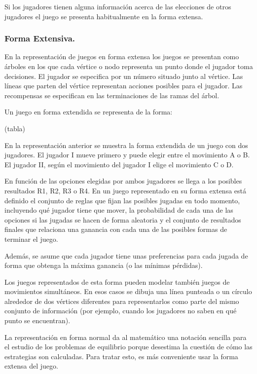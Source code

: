 \documentclass[a4paper]{report} %
\begin{document}
Si los jugadores tienen alguna información acerca de las elecciones de otros jugadores el juego se presenta habitualmente en la forma extensa. 

\subsubsection{Forma Extensiva.}

En la representación de juegos en forma extensa los juegos se presentan como árboles en los que cada vértice o nodo representa un punto donde el jugador toma decisiones. El jugador se especifica por un número situado junto al vértice. Las líneas que parten del vértice representan acciones posibles para el jugador. Las recompensas se especifican en las terminaciones de las ramas del árbol. 

Un juego en forma extendida se representa de la forma: 

(tabla)


En la representación anterior se muestra la forma extendida de un juego con dos jugadores. El jugador I mueve primero y puede elegir entre el movimiento A o B. El jugador II, según el movimiento del jugador I elige el movimiento C o D.

En función de las opciones elegidas por ambos jugadores se llega a los posibles resultados R1, R2, R3 o R4. En un juego representado en su forma extensa está definido el conjunto de reglas que fijan las posibles jugadas en todo momento, incluyendo qué jugador tiene que mover, la probabilidad de cada una de las opciones si las jugadas se hacen de forma aleatoria y el conjunto de resultados finales que relaciona una ganancia con cada una de las posibles formas de terminar el juego.

Además, se asume que cada jugador tiene unas preferencias para cada jugada de forma que obtenga la máxima ganancia (o las mínimas pérdidas). 

Los juegos representados de esta forma pueden modelar también juegos de movimientos simultáneos. En esos casos se dibuja una línea punteada o un círculo alrededor de dos vértices diferentes para representarlos como parte del mismo conjunto de información (por ejemplo, cuando los jugadores no saben en qué punto se encuentran). 

La representación en forma normal da al matemático una notación sencilla para el estudio de los problemas de equilibrio porque desestima la cuestión de cómo las estrategias son calculadas. Para tratar esto, es más conveniente usar la forma extensa del juego. 
\end{document}
